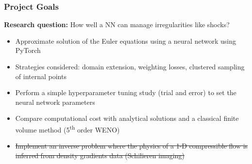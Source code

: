 \documentclass[aspectratio=169]{beamer}
\begin{document}
\begin{frame}\frametitle{Project Goals}
	
	\textbf{\textcolor{myOrange}{Research question:}} How well a NN can manage \textcolor{myOrange}{irregularities} 
	like shocks? 
	
	\begin{itemize}
		\item Approximate solution of the Euler equations using a neural network using PyTorch
		\vspace{2mm}
		\item Strategies considered: domain extension, weighting losses, clustered sampling of internal points
		\vspace{2mm}
		\item Perform a simple hyperparameter tuning study (trial and error) to set the neural network parameters
		\vspace{2mm}
		\item Compare computational cost with analytical solutions and a classical finite volume method (5\textsuperscript{th} order WENO)
		\vspace{2mm}
		\item \sout{Implement an inverse problem where the physics of a 1-D compressible flow is inferred from
			density gradients data (Schilieren imaging)} 	
	\end{itemize}
\end{frame}
\end{document}
